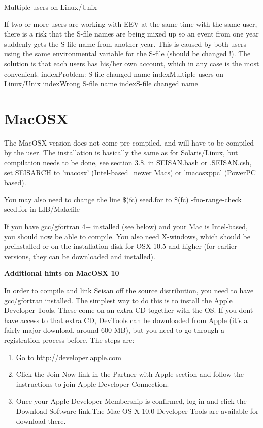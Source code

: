 Multiple users on Linux/Unix

If two or more users are working with EEV at the same time with the same user, there is a risk that the S-file names are being mixed up so an event from one year suddenly gets the S-file name from another year. This is caused by both users using the same environmental variable for the S-file (should be changed !). The solution is that each users has his/her own account, which in any case is the most convenient.
index{Problem: S-file changed name}
index{Multiple users on Linux/Unix}
index{Wrong S-file name}
index{S-file changed name}

\section{MacOSX}

The MacOSX version does not come pre-compiled, and will have to be compiled by the user. The installation is basically the same as for Solaris/Linux, but compilation needs to be done, see section 3.8. in SEISAN.bash or .SEISAN.csh, set SEISARCH to 'macosx' (Intel-based=newer Macs) or 'macosxppc' (PowerPC based). 

You may also need to change the line
\$(fc) seed.for
to
\$(fc) -fno-range-check seed.for
in LIB/Makefile

If you have gcc/gfortran 4+ installed (see below) and your Mac is Intel-based, you should now be able to compile.  You also need X-windows, which should be preinstalled or on the installation disk for OSX 10.5 and higher (for earlier versions, they can be downloaded and installed).

\textbf{Additional hints on MacOSX 10}

In order to compile and link Seisan off the source distribution, you need to have gcc/gfortran installed.  The simplest way to do this is to install the Apple Developer Tools. These come on an extra CD together with the OS. If you dont have access to that extra CD, DevTools can be downloaded from Apple (it’s a fairly major download, around 600 MB), but you need to go through a registration process before. The steps are:

\begin{enumerate}
\item Go to \url{http://developer.apple.com}
\item Click the Join Now link in the Partner with Apple section and follow the instructions to join Apple
Developer Connection.
\item Once your Apple Developer Membership is confirmed, log in and click the Download Software link.The Mac OS X 10.0 Developer Tools are available for download there.
\end{enumerate}

